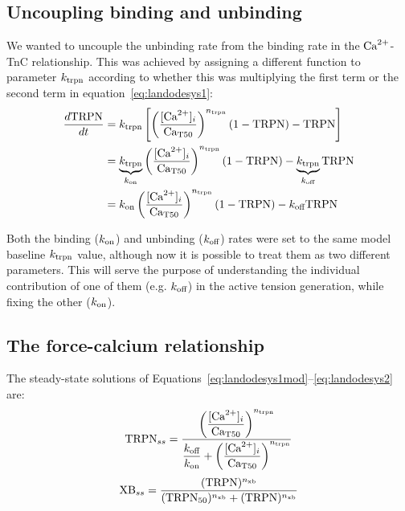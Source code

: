 

%
%
%
\subsection{Uncoupling binding and unbinding}
We wanted to uncouple the unbinding rate from the binding rate in the $\textrm{Ca}^{2+}$-TnC relationship. This was achieved by assigning a different function to parameter $k_{\textrm{trpn}}$ according to whether this was multiplying the first term or the second term in equation~\eqref{eq:landodesys1}:
%
\begin{align}
    \frac{d\text{TRPN}}{dt} &=k_{\textrm{trpn}}\left[\left(\frac{[\textrm{Ca}^{2+}]_{i}}{\textrm{Ca}_{\textrm{T}50}}\right)^{n_{\textrm{trpn}}}(1-\textrm{TRPN})-\textrm{TRPN}\right] \\
    &= \underbrace{k_{\textrm{trpn}}}_{k_{\textrm{on}}}\left(\frac{[\textrm{Ca}^{2+}]_{i}}{\textrm{Ca}_{\textrm{T}50}}\right)^{n_{\textrm{trpn}}}(1-\textrm{TRPN})-\underbrace{k_{\textrm{trpn}}}_{k_{\textrm{off}}}\textrm{TRPN} \\
    &= k_{\textrm{on}}\left(\frac{[\textrm{Ca}^{2+}]_{i}}{\textrm{Ca}_{\textrm{T}50}}\right)^{n_{\textrm{trpn}}}(1-\textrm{TRPN})-k_{\textrm{off}}\textrm{TRPN} \label{eq:landodesys1mod}
\end{align}

\vspace{0.2cm}\noindent
Both the binding ($k_{\textrm{on}}$) and unbinding ($k_{\textrm{off}}$) rates were set to the same model baseline $k_{\textrm{trpn}}$ value, although now it is possible to treat them as two different parameters. This will serve the purpose of understanding the individual contribution of one of them (e.g. $k_{\textrm{off}}$) in the active tension generation, while fixing the other ($k_{\textrm{on}}$).


%
%
%
\subsection{The force-calcium relationship}\label{sec:ch2theforcecalciumrelationship}
The steady-state solutions of Equations~\eqref{eq:landodesys1mod}--\eqref{eq:landodesys2} are:
%
\begin{equation}\label{eq:landodesys1_ss}
    \textrm{TRPN}_{ss} = \dfrac{\left(\dfrac{[\textrm{Ca}^{2+}]_{i}}{\textrm{Ca}_{\textrm{T}50}}\right)^{n_{\textrm{trpn}}}}{\dfrac{k_{\textrm{off}}}{k_{\textrm{on}}}+\left(\dfrac{[\textrm{Ca}^{2+}]_{i}}{\textrm{Ca}_{\textrm{T}50}}\right)^{n_{\textrm{trpn}}}}
\end{equation}
%
\begin{equation}\label{eq:landodesys2_ss}
    \textrm{XB}_{ss} = \frac{(\textrm{TRPN})^{n_{\textrm{xb}}}}{(\textrm{TRPN}_{50})^{n_{\textrm{xb}}}+(\textrm{TRPN})^{n_{\textrm{xb}}}}
\end{equation}

